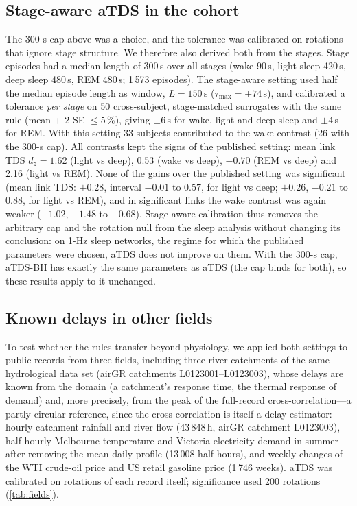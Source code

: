 \documentclass[11pt,a4paper]{article}
\begin{document}
\subsection{Stage-aware aTDS in the cohort}
\label{sec:res-stage}
The 300-s cap above was a choice, and the tolerance was calibrated on rotations that ignore stage structure. We therefore also derived both from the stages. Stage episodes had a median length of 300\,s over all stages (wake 90\,s, light sleep 420\,s, deep sleep 480\,s, REM 480\,s; 1\,573 episodes). The stage-aware setting used half the median episode length as window, $L = 150$\,s ($\tau_{\max} = \pm74$\,s), and calibrated a tolerance \emph{per stage} on 50 cross-subject, stage-matched surrogates with the same rule (mean + 2 SE $\le 5$\,\%), giving $\pm6$\,s for wake, light and deep sleep and $\pm4$\,s for REM. With this setting 33 subjects contributed to the wake contrast (26 with the 300-s cap). All contrasts kept the signs of the published setting: mean link TDS $d_z = 1.62$ (light vs deep), 0.53 (wake vs deep), $-0.70$ (REM vs deep) and 2.16 (light vs REM). None of the gains over the published setting was significant (mean link TDS: $+0.28$, interval $-0.01$ to $0.57$, for light vs deep; $+0.26$, $-0.21$ to $0.88$, for light vs REM), and in significant links the wake contrast was again weaker ($-1.02$, $-1.48$ to $-0.68$). Stage-aware calibration thus removes the arbitrary cap and the rotation null from the sleep analysis without changing its conclusion: on 1-Hz sleep networks, the regime for which the published parameters were chosen, aTDS does not improve on them. With the 300-s cap, aTDS-BH has exactly the same parameters as aTDS (the cap binds for both), so these results apply to it unchanged.

\subsection{Known delays in other fields}
\label{sec:res-fields}
To test whether the rules transfer beyond physiology, we applied both settings to public records from three fields, including three river catchments of the same hydrological data set (airGR catchments L0123001--L0123003), whose delays are known from the domain (a catchment's response time, the thermal response of demand) and, more precisely, from the peak of the full-record cross-correlation---a partly circular reference, since the cross-correlation is itself a delay estimator: hourly catchment rainfall and river flow (43\,848\,h, airGR catchment L0123003), half-hourly Melbourne temperature and Victoria electricity demand in summer after removing the mean daily profile (13\,008 half-hours), and weekly changes of the WTI crude-oil price and US retail gasoline price (1\,746 weeks). aTDS was calibrated on rotations of each record itself; significance used 200 rotations (\cref{tab:fields}).
\end{document}
